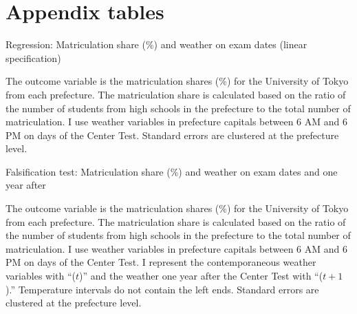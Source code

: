 \documentclass[12pt,letterpaper]{article}
\begin{document}
\setcounter{figure}{0}
\setcounter{table}{0}
\renewcommand\thefigure{\Alph{section}.\arabic{figure}}
\renewcommand\thetable{\Alph{section}.\arabic{table}}
  
\section{Appendix tables}\label{sec:appendix_table}

\begin{table}[H]
  \center
  \caption{Regression: Matriculation share (\%) and weather on exam dates (linear specification)}
  \small
  
  \label{tab:linear_reg}
  \small
  \begin{tablenotes}
    \item
      The outcome variable is the matriculation shares (\%) for the University of Tokyo from each prefecture.
      The matriculation share is calculated based on the ratio of the number of students from high schools in the prefecture to the total number of matriculation.
      I use weather variables in prefecture capitals between 6 AM and 6 PM on days of the Center Test.
      Standard errors are clustered at the prefecture level.
  \end{tablenotes}
\end{table}

\begin{table}[H]
  \center
  \caption{Falsification test: Matriculation share (\%) and weather on exam dates and one year after}
  \scriptsize
  
  \label{tab:reg_placebo_exam}
  \scriptsize
  \begin{tablenotes}
    \item
      The outcome variable is the matriculation shares (\%) for the University of Tokyo from each prefecture.
      The matriculation share is calculated based on the ratio of the number of students from high schools in the prefecture to the total number of matriculation.
      I use weather variables in prefecture capitals between 6 AM and 6 PM on days of the Center Test.
      I represent the contemporaneous weather variables with ``($t$)'' and the weather one year after the Center Test with ``($t + 1$).''
      Temperature intervals do not contain the left ends.
      Standard errors are clustered at the prefecture level.
  \end{tablenotes}
\end{table}
\end{document}
